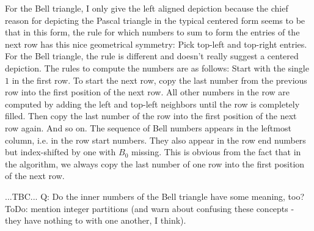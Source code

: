 For the Bell triangle, I only give the left aligned depiction because the chief reason for depicting the Pascal triangle in the typical centered form seems to be that in this form, the rule for which numbers to sum to form the entries of the next row has this nice geometrical symmetry: Pick top-left and top-right entries. For the Bell triangle, the rule is different and doesn't really suggest a centered depiction. The rules to compute the numbers are as follows: Start with the single $1$ in the first row. To start the next row, copy the last number from the previous row into the first position of the next row. All other numbers in the row are computed by adding the left and top-left neighbors until the row is completely filled. Then copy the last number of the row into the first position of the next row again. And so on. The sequence of Bell numbers appears in the leftmost column, i.e. in the row start numbers. They also appear in the row end numbers but index-shifted by one with $B_0$ missing. This is obvious from the fact that in the algorithm, we always copy the last number of one row into the first position of the next row.

...TBC... Q: Do the inner numbers of the Bell triangle have some meaning, too? ToDo: mention integer partitions (and warn about confusing these concepts - they have nothing to with one another, I think).







